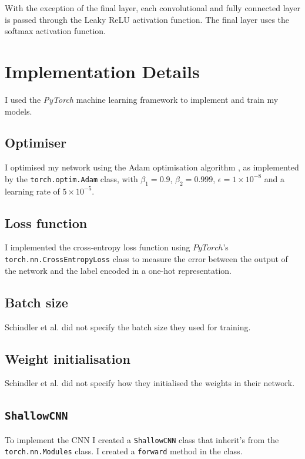 \documentclass[conference]{IEEEtran}
\begin{document}
With the exception of the final layer, each convolutional and fully connected layer is passed through the Leaky ReLU activation function.
The final layer uses the softmax activation function.

\section{Implementation Details}

I used the \textit{PyTorch} \cite{PyTorch} machine learning framework to implement and train my models.

\subsection{Optimiser}

I optimised my network using the Adam optimisation algorithm \cite{KingmaBa}, as implemented by the \texttt{torch.optim.Adam} class, with $\beta_1=0.9$, $\beta_2=0.999$, $\epsilon=1\times10^{-8}$ and a learning rate of $5\times10^{-5}$.

\subsection{Loss function}

I implemented the cross-entropy loss function using $PyTorch$'s \texttt{torch.nn.CrossEntropyLoss} class to measure the error between the output of the network and the label encoded in a one-hot representation.

\subsection{Batch size}

Schindler et al. did not specify the batch size they used for training.

\subsection{Weight initialisation}

Schindler et al. did not specify how they initialised the weights in their network.

\subsection{\texttt{ShallowCNN}}

To implement the CNN I created a \texttt{ShallowCNN} class that inherit's from the \texttt{torch.nn.Modules} class.
I created a \texttt{forward} method in the class.
\end{document}
